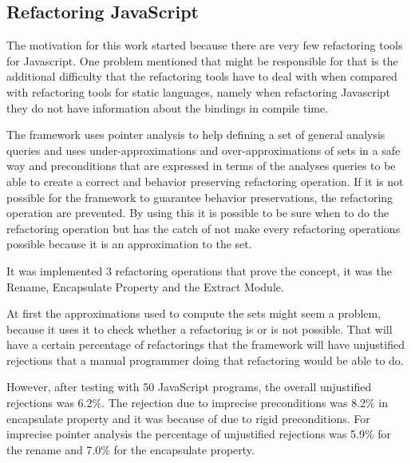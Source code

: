\subsection{Refactoring JavaScript}

The motivation for this work \cite{feldthaus2011tool} started because there are very few refactoring tools for Javascript. One problem mentioned that might be responsible for that is the additional difficulty that the refactoring tools have to deal with when compared with refactoring tools for static languages, namely when refactoring Javascript they do not have information about the bindings in compile time.



The framework uses pointer analysis to help defining a set of general analysis queries and uses under-approximations and over-approximations of sets in a safe way and preconditions that are expressed in terms of the analyses queries to be able to create a correct and behavior preserving refactoring operation. If it is not possible for the framework to guarantee behavior preservations, the refactoring operation are prevented.
By using this it is possible to be sure when to do the refactoring operation but has the catch of not make every refactoring operations possible because it is an approximation to the set.

It was implemented 3 refactoring operations that prove the concept, it was the Rename, Encapsulate Property and the Extract Module.

At first the approximations used to compute the sets might seem a problem, because it uses it to check whether a refactoring is or is not possible. That will have a certain percentage of refactorings that the framework will have unjustified rejections that a manual programmer doing that refactoring would be able to do.

However, after testing with 50 JavaScript programs, the overall unjustified rejections was 6.2\%. The rejection due to imprecise preconditions was 8.2\% in encapsulate property and it was because of due to rigid preconditions. For imprecise pointer analysis the percentage of unjustified rejections was 5.9\% for the rename and 7.0\% for the encapsulate property. 

